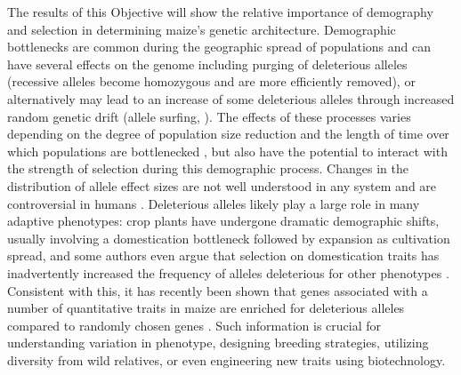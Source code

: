 
The results of this Objective will show the relative importance of demography and selection in determining maize's genetic architecture. Demographic bottlenecks are common during the geographic spread of populations and can have several effects on the genome including purging of deleterious alleles (recessive alleles become homozygous and are more efficiently removed), or alternatively may lead to an increase of some deleterious alleles through increased random genetic drift (allele surfing, \citealt{Klopfstein:2005bl}). The effects of these processes varies depending on the degree of population size reduction and the length of time over which populations are bottlenecked \citep[e.g.][]{Caplins:2008ke}, but also have the potential to interact with the strength of selection during this demographic process. Changes in the distribution of allele effect sizes are not well understood in any system and are controversial in humans \citep{Hancock:2011jb, Henn:2015ce, Henn:2015dp, Lohmueller:2014dn, Simons:2014fj}. Deleterious alleles likely play a large role in many adaptive phenotypes: crop plants have undergone dramatic demographic shifts, usually involving a domestication bottleneck followed by expansion as cultivation spread, and some authors even argue that selection on domestication traits has inadvertently increased the frequency of alleles deleterious for other phenotypes \citep{Gunther:2010}. Consistent with this, it has recently been shown that genes associated with a number of quantitative traits in maize are enriched for deleterious alleles compared to randomly chosen genes \citep{Mezmouk:2014jd}. Such information is crucial for understanding variation in phenotype, designing breeding strategies, utilizing diversity from wild relatives, or even engineering new traits using biotechnology. 

